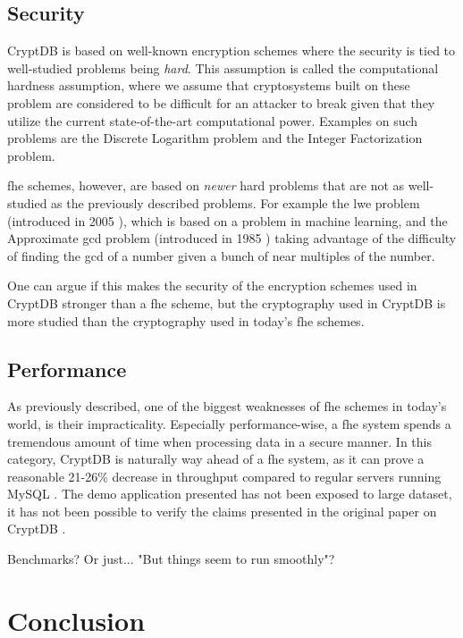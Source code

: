 \subsection{Security}

CryptDB is based on well-known encryption schemes where the security is tied to well-studied problems being \emph{hard}. This assumption is called the computational hardness assumption, where we assume that cryptosystems built on these problem are considered to be difficult for an attacker to break given that they utilize the current state-of-the-art computational power. Examples on such problems are the Discrete Logarithm problem and the Integer Factorization problem.

\gls{fhe} schemes, however, are based on \emph{newer} hard problems that are not as well-studied as the previously described problems. For example the \gls{lwe} problem (introduced in 2005 \cite{lwe}), which is based on a problem in machine learning, and the Approximate \gls{gcd} problem (introduced in 1985 \cite{app_gcd}) taking advantage of the difficulty of finding the \gls{gcd} of a number given a bunch of near multiples of the number.

One can argue if this makes the security of the encryption schemes used in CryptDB stronger than a \gls{fhe} scheme, but the cryptography used in CryptDB is more studied than the cryptography used in today's \gls{fhe} schemes.

\subsection{Performance}

As previously described, one of the biggest weaknesses of \gls{fhe} schemes in today's world, is their impracticality. Especially performance-wise, a \gls{fhe} system spends a tremendous amount of time when processing data in a secure manner. In this category, CryptDB is naturally way ahead of a \gls{fhe} system, as it can prove a reasonable 21-26\% decrease in throughput compared to regular servers running MySQL \cite{CryptDB_Main_Paper}. The demo application presented has not been exposed to large dataset, it has not been possible to verify the claims presented in the original paper on CryptDB \citep{CryptDB_Main_Paper}.

Benchmarks? Or just... "But things seem to run smoothly"?

\section{Conclusion}

